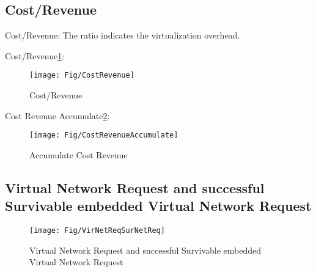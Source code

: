 \subsection{Cost/Revenue}
Cost/Revenue: The ratio indicates the virtualization overhead.

Cost/Revenue\ref{fig:CostRevenue}:
\begin{figure}
  \centering
  \texttt{[image: Fig/CostRevenue]}\\
  \caption{Cost/Revenue}\label{fig:CostRevenue}
\end{figure}

Cost Revenue Accumulate\ref{fig:CostRevenueAccumulate}:
\begin{figure}
  \centering
  \texttt{[image: Fig/CostRevenueAccumulate]}\\
  \caption{Accumulate Cost Revenue}\label{fig:CostRevenueAccumulate}
\end{figure}

\subsection{Virtual Network Request and successful Survivable embedded Virtual Network Request}
\begin{figure}
  \centering
  \texttt{[image: Fig/VirNetReqSurNetReq]}\\
  \caption{Virtual Network Request and successful Survivable embedded Virtual Network Request}\label{fig:VirNetReqSurNetReq}
\end{figure}




